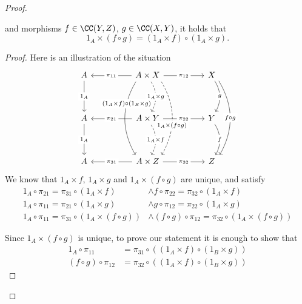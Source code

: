 \begin{solution}
\begin{proof}
\begin{lemma}
				and morphisms $f \in \CC(Y, Z)$, $g \in \CC(X, Y)$,
				it holds that
				\[
					1_A \times (f \circ g) = (1_A \times f) \circ (1_A \times g).
				\]
			\end{lemma}
			\begin{proof}
				Here is an illustration of the situation
				\[
					\begin{tikzcd}
						A && {A \times X} && X \\
						\\
						A && {A \times Y} && Y \\
						\\
						A && {A \times Z} && Z
						\arrow["{1_A}"{description}, from=1-1, to=3-1]
						\arrow["{1_A}"{description}, from=3-1, to=5-1]
						\arrow["g"{description}, bend left, from=1-5, to=3-5]
						\arrow["f"{description}, bend left, from=3-5, to=5-5]
						\arrow["{f \circ g}"{description}, bend left, shift left=2, from=1-5, to=5-5]
						\arrow["\pi_{11}"{description},from=1-3, to=1-1]
						\arrow["\pi_{12}"{description},from=1-3, to=1-5]
						\arrow["\pi_{21}"{description},from=3-3, to=3-1]
						\arrow["\pi_{22}"{description},from=3-3, to=3-5]
						\arrow["\pi_{31}"{description},from=5-3, to=5-1]
						\arrow["\pi_{32}"{description},from=5-3, to=5-5]
						\arrow["{1_A \times g}"{description}, bend left, dashed, from=1-3, to=3-3]
						\arrow["{1_A \times f}"{description}, bend left, dashed, from=3-3, to=5-3]
						\arrow["{1_A \times (f \circ g)}"{description, pos=0.6}, bend left, shift left=5, dashed, from=1-3, to=5-3]
						\arrow["{(1_A \times f) \circ (1_B \times g)}"{description, pos=0.3}, shift right=4, bend right, from=1-3, to=5-3]
					\end{tikzcd}
				\]
				We know that $1_A \times f$, $1_A \times g$ and $1_A \times (f \circ g)$ are unique, and satisfy
				\begin{align}
					1_A \circ \pi_{21} = \pi_{31} \circ (1_A \times f)           & \wedge f \circ \pi_{22} = \pi_{32} \circ (1_A \times f) \label{Hf}          \\
					1_A \circ \pi_{11} = \pi_{21} \circ (1_A \times g)           & \wedge g \circ \pi_{12} = \pi_{22} \circ (1_A \times g) \label{Hg}          \\
					1_A \circ \pi_{11} = \pi_{31} \circ (1_A \times (f \circ g)) & \wedge (f \circ g) \circ \pi_{12} = \pi_{32} \circ (1_A \times (f \circ g))
				\end{align}

				Since $1_A \times (f \circ g)$ is unique, to prove our statement it is enough to show that
				\begin{align}
					1_A \circ \pi_{11}         & = \pi_{31} \circ ((1_A \times f) \circ (1_B \times g)) \label{goal:left}  \\
					(f \circ g) \circ \pi_{12} & = \pi_{32} \circ ((1_A \times f) \circ (1_B \times g)) \label{goal:right}
				\end{align}


\end{proof}
\end{proof}
\end{solution}
